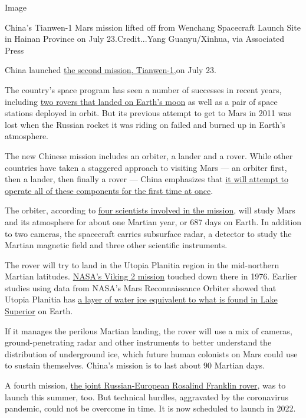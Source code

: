 Image

China's Tianwen-1 Mars mission lifted off from Wenchang Spacecraft
Launch Site in Hainan Province on July 23.Credit...Yang Guanyu/Xinhua,
via Associated Press

China launched
\href{https://www.nytimes.com/2020/07/22/science/mars-china-launch.html}{the
second mission, Tianwen-1,}on July 23.

The country's space program has seen a number of successes in recent
years, including
\href{https://www.nytimes.com/2020/02/26/science/china-moon-far-side.html}{two
rovers that landed on Earth's moon} as well as a pair of space stations
deployed in orbit. But its previous attempt to get to Mars in 2011 was
lost when the Russian rocket it was riding on failed and burned up in
Earth's atmosphere.

The new Chinese mission includes an orbiter, a lander and a rover. While
other countries have taken a staggered approach to visiting Mars --- an
orbiter first, then a lander, then finally a rover --- China emphasizes
that
\href{https://www.nytimes.com/2020/07/22/science/china-mars-mission.html}{it
will attempt to operate all of these components for the first time at
once}.

The orbiter, according to
\href{https://www.nature.com/articles/s41550-020-1148-6}{four scientists
involved in the mission}, will study Mars and its atmosphere for about
one Martian year, or 687 days on Earth. In addition to two cameras, the
spacecraft carries subsurface radar, a detector to study the Martian
magnetic field and three other scientific instruments.

The rover will try to land in the Utopia Planitia region in the
mid-northern Martian latitudes.
\href{https://mars.nasa.gov/mars-exploration/missions/viking-1-2/}{NASA's
Viking 2 mission} touched down there in 1976. Earlier studies using data
from NASA's Mars Reconnaissance Orbiter showed that Utopia Planitia has
\href{https://www.jpl.nasa.gov/news/news.php?feature=6680}{a layer of
water ice equivalent to what is found in Lake Superior} on Earth.

If it manages the perilous Martian landing, the rover will use a mix of
cameras, ground-penetrating radar and other instruments to better
understand the distribution of underground ice, which future human
colonists on Mars could use to sustain themselves. China's mission is to
last about 90 Martian days.

A fourth mission,
\href{https://www.nytimes.com/2020/03/12/science/mars-rover-coronavirus.html}{the
joint Russian-European Rosalind Franklin rover}, was to launch this
summer, too. But technical hurdles, aggravated by the coronavirus
pandemic, could not be overcome in time. It is now scheduled to launch
in 2022.

